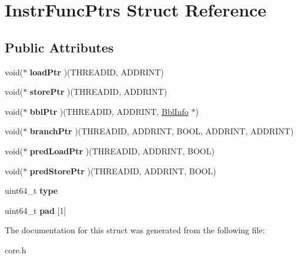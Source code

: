 \hypertarget{structInstrFuncPtrs}{\section{Instr\-Func\-Ptrs Struct Reference}
\label{structInstrFuncPtrs}
}
\subsection*{Public Attributes}
\begin{DoxyCompactItemize}
\item 
\hypertarget{structInstrFuncPtrs_a7c6744818f5d47c60f066d939629e03f}{void($\ast$ {\bfseries load\-Ptr} )(T\-H\-R\-E\-A\-D\-I\-D, A\-D\-D\-R\-I\-N\-T)}\label{structInstrFuncPtrs_a7c6744818f5d47c60f066d939629e03f}

\item 
\hypertarget{structInstrFuncPtrs_a033ef32c4a6f0db882e665e24d1a7aed}{void($\ast$ {\bfseries store\-Ptr} )(T\-H\-R\-E\-A\-D\-I\-D, A\-D\-D\-R\-I\-N\-T)}\label{structInstrFuncPtrs_a033ef32c4a6f0db882e665e24d1a7aed}

\item 
\hypertarget{structInstrFuncPtrs_a3dbf17378ec01f9b4c1632afd6cefec6}{void($\ast$ {\bfseries bbl\-Ptr} )(T\-H\-R\-E\-A\-D\-I\-D, A\-D\-D\-R\-I\-N\-T, \hyperlink{structBblInfo}{Bbl\-Info} $\ast$)}\label{structInstrFuncPtrs_a3dbf17378ec01f9b4c1632afd6cefec6}

\item 
\hypertarget{structInstrFuncPtrs_ac1443699cb66dc7655af1e0b42433aff}{void($\ast$ {\bfseries branch\-Ptr} )(T\-H\-R\-E\-A\-D\-I\-D, A\-D\-D\-R\-I\-N\-T, B\-O\-O\-L, A\-D\-D\-R\-I\-N\-T, A\-D\-D\-R\-I\-N\-T)}\label{structInstrFuncPtrs_ac1443699cb66dc7655af1e0b42433aff}

\item 
\hypertarget{structInstrFuncPtrs_a43e3a5545d5d2c5d268c6c4fd8521752}{void($\ast$ {\bfseries pred\-Load\-Ptr} )(T\-H\-R\-E\-A\-D\-I\-D, A\-D\-D\-R\-I\-N\-T, B\-O\-O\-L)}\label{structInstrFuncPtrs_a43e3a5545d5d2c5d268c6c4fd8521752}

\item 
\hypertarget{structInstrFuncPtrs_a6cdfa6c2eab79b7cfbd92e8f14fc0a56}{void($\ast$ {\bfseries pred\-Store\-Ptr} )(T\-H\-R\-E\-A\-D\-I\-D, A\-D\-D\-R\-I\-N\-T, B\-O\-O\-L)}\label{structInstrFuncPtrs_a6cdfa6c2eab79b7cfbd92e8f14fc0a56}

\item 
\hypertarget{structInstrFuncPtrs_a400c3a9cc3eab0f817c34674103262df}{uint64\-\_\-t {\bfseries type}}\label{structInstrFuncPtrs_a400c3a9cc3eab0f817c34674103262df}

\item 
\hypertarget{structInstrFuncPtrs_ac67641c28667f004869ec80056d8c78f}{uint64\-\_\-t {\bfseries pad} \mbox{[}1\mbox{]}}\label{structInstrFuncPtrs_ac67641c28667f004869ec80056d8c78f}

\end{DoxyCompactItemize}


The documentation for this struct was generated from the following file\-:\begin{DoxyCompactItemize}
\item 
core.\-h\end{DoxyCompactItemize}
